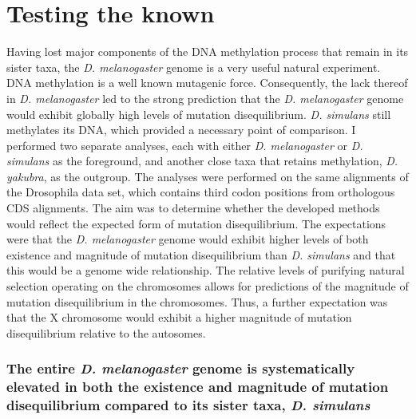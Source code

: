 

\section{Testing the known}

Having lost major components of the DNA methylation process that remain in its sister taxa, the \textit{D. melanogaster} genome is a very useful natural experiment. DNA methylation is a well known mutagenic force. Consequently, the lack thereof in
\textit{D. melanogaster} led to the strong prediction that the \textit{D. melanogaster} genome would exhibit globally high levels of mutation disequilibrium. \textit{D. simulans} still methylates its DNA, which provided a necessary point of comparison. I performed two separate analyses, each with either \textit{D. melanogaster} or \textit{D. simulans} as the foreground, and another close taxa that retains methylation, \textit{D. yakubra}, as the outgroup. The analyses were performed on the same alignments of the Drosophila data set, which contains third codon positions from orthologous CDS alignments. The aim was to determine whether the developed methods would reflect the expected form of mutation disequilibrium. The expectations were that the \textit{D. melanogaster} genome would exhibit higher levels of both existence and magnitude of mutation disequilibrium than \textit{D. simulans} and that this would be a genome wide relationship. The relative levels of purifying natural selection operating on the chromosomes allows for predictions of the magnitude of mutation disequilibrium in the chromosomes. Thus, a further expectation was that the X chromosome would exhibit a higher magnitude of mutation disequilibrium relative to the autosomes. 

\subsubsection*{The entire \textit{D. melanogaster} genome is systematically elevated in both the existence and magnitude of mutation disequilibrium compared to its sister taxa, \textit{D. simulans}}

